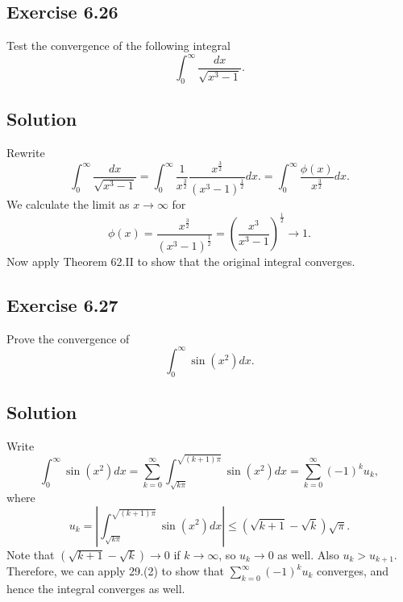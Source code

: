 \subsection*{Exercise 6.26}

Test the convergence of the following integral
\begin{equation*}
    \int_0^{\infty} \frac{dx}{\sqrt{x^3 - 1}}.
\end{equation*}

\subsection*{Solution}
Rewrite
\begin{equation*}
    \int_0^{\infty} \frac{dx}{\sqrt{x^3 - 1}}
        = \int_0^{\infty} \frac{1}{x^{\frac{3}{2}}} \frac{x^{\frac{3}{2}}}{(x^3 - 1)^{\frac{1}{2}}} dx.
        = \int_0^{\infty} \frac{\phi(x)}{x^{\frac{3}{2}}} dx.
\end{equation*}
We calculate the limit as $x \to \infty$ for
\begin{equation*}
    \phi(x) = \frac{x^{\frac{3}{2}}}{(x^3 - 1)^{\frac{1}{2}}}
        = \left( \frac{x^3}{x^3 - 1} \right)^{\frac{1}{2}}
        \to 1.
\end{equation*}
Now apply Theorem 62.II to show that the original integral converges.


\subsection*{Exercise 6.27}

Prove the convergence of
\begin{equation*}
    \int_0^{\infty} \sin(x^2) dx.
\end{equation*}

\subsection*{Solution}

Write
\begin{equation*}
    \int_0^{\infty} \sin(x^2) dx
        = \sum_{k = 0}^{\infty} \int_{\sqrt{k \pi}}^{\sqrt{(k + 1) \pi}} \sin(x^2) dx
        = \sum_{k = 0}^{\infty} (-1)^k u_k,
\end{equation*}
where
\begin{equation*}
    u_k = \left| \int_{\sqrt{k \pi}}^{\sqrt{(k + 1)\pi}} \sin(x^2) dx \right| \leq (\sqrt{k+1} - \sqrt{k}) \sqrt{\pi}.
\end{equation*}
Note that $(\sqrt{k+1} - \sqrt{k}) \to 0$ if $k \to \infty$, so $u_k \to 0$ as well.
Also $u_k > u_{k+1}$.
Therefore, we can apply 29.(2) to show that $\sum_{k = 0}^{\infty} (-1)^k u_k$ converges, and hence the integral converges as well.


